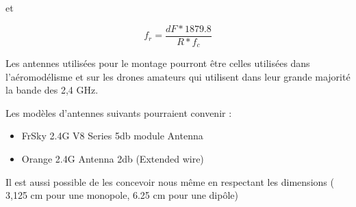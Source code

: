 et

\begin{equation}
f_r = \frac{dF*1879.8}{R*f_c}
\end{equation}

Les antennes utilisées pour le montage pourront être celles utilisées dans l'aéromodélisme et sur les drones amateurs qui utilisent dans leur grande majorité la bande des 2,4 GHz.

Les modèles d'antennes suivants pourraient convenir :

\begin{itemize}

\item FrSky 2.4G V8 Series 5db module Antenna

\item Orange 2.4G Antenna 2db (Extended wire)

\end{itemize}

Il est aussi possible de les concevoir nous même en respectant les dimensions ( 3,125 cm pour une monopole, 6.25 cm pour une dipôle)

